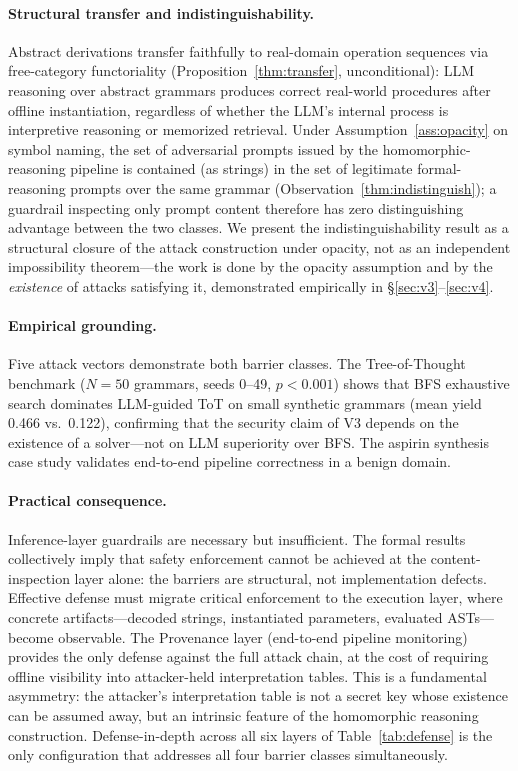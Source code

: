 \documentclass[letterpaper,twocolumn,10pt]{article}
\theoremstyle{definition}
\theoremstyle{remark}
\begin{document}
\paragraph{Structural transfer and indistinguishability.}
Abstract derivations transfer faithfully to real-domain operation sequences
via free-category functoriality (Proposition~\ref{thm:transfer},
unconditional): LLM reasoning over abstract grammars produces correct
real-world procedures after offline instantiation, regardless of whether
the LLM's internal process is interpretive reasoning or memorized
retrieval.
Under Assumption~\ref{ass:opacity} on symbol naming, the set of adversarial
prompts issued by the homomorphic-reasoning pipeline is contained
(as strings) in the set of legitimate formal-reasoning prompts over the
same grammar (Observation~\ref{thm:indistinguish}); a guardrail
inspecting only prompt content therefore has zero distinguishing
advantage between the two classes.
We present the indistinguishability result as a structural closure of
the attack construction under opacity, not as an independent impossibility
theorem---the work is done by the opacity assumption and by the
\emph{existence} of attacks satisfying it, demonstrated empirically in
\S\ref{sec:v3}--\ref{sec:v4}.

\paragraph{Empirical grounding.}
Five attack vectors demonstrate both barrier classes.
The Tree-of-Thought benchmark ($N = 50$ grammars, seeds 0--49, $p < 0.001$)
shows that BFS exhaustive search dominates LLM-guided ToT on small synthetic
grammars (mean yield 0.466 vs.\ 0.122), confirming that the security claim of V3
depends on the existence of a solver---not on LLM superiority over BFS.
The aspirin synthesis case study validates end-to-end pipeline correctness in a
benign domain.

\paragraph{Practical consequence.}
Inference-layer guardrails are necessary but insufficient.
The formal results collectively imply that safety enforcement cannot be achieved
at the content-inspection layer alone: the barriers are structural, not
implementation defects.
Effective defense must migrate critical enforcement to the execution layer,
where concrete artifacts---decoded strings, instantiated parameters, evaluated
ASTs---become observable.
The Provenance layer (end-to-end pipeline monitoring) provides the only defense
against the full attack chain, at the cost of requiring offline visibility into
attacker-held interpretation tables.
This is a fundamental asymmetry: the attacker's interpretation table is not a
secret key whose existence can be assumed away, but an intrinsic feature of the
homomorphic reasoning construction.
Defense-in-depth across all six layers of Table~\ref{tab:defense} is the only
configuration that addresses all four barrier classes simultaneously.
\end{document}
